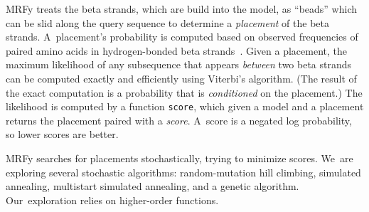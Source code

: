 \documentclass[preprint,nonatbib,blockstyle,nocopyrightspace,times]{sigplanconf}
\let\cite\citep
\begin{document}
MRFy treats the beta 
strands, which are build into the model,
 as ``beads'' which can be slid along the query sequence to determine
 a \emph{placement} of the beta strands.
A~placement's probability is computed
based on observed frequencies of paired amino acids in 
hydrogen-bonded beta strands~\cite{Cowen:2002p588}.
Given a placement, the maximum likelihood of any subsequence that appears
\emph{between} two beta strands can be computed exactly and
efficiently using Viterbi's algorithm.
(The result of the exact computation is a probability that is
\emph{conditioned} on the placement.)
The likelihood is computed by a function \texttt{score},
which given a model and a {placement} returns the {placement}
paired with a \emph{score}.
A~score is a negated log probability, so lower scores are better.

MRFy searches for placements stochastically,
trying to minimize scores.
We~are exploring several stochastic algorithms: random-mutation hill
climbing, simulated  
annealing, multistart simulated annealing, and a genetic algorithm.
Our~exploration relies on higher-order functions.
\end{document}
